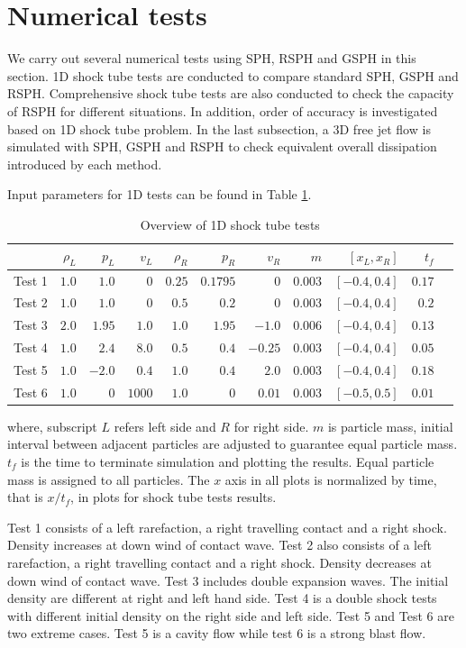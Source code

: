\section{Numerical tests}
We carry out several numerical tests using SPH, RSPH and GSPH in this section.
1D shock tube tests are conducted to compare standard SPH, GSPH and RSPH. Comprehensive shock tube tests are also conducted to check the capacity of RSPH for different situations. In addition, order of accuracy is investigated based on 1D shock tube problem. 
In the last subsection, a 3D free jet flow is simulated with SPH, GSPH and RSPH to check equivalent overall dissipation introduced by each method.

Input parameters for 1D tests can be found in Table \ref{tab:1D-shock-input_parameters}. 
\begin{table}[htp]
\centering
      \caption{Overview of 1D shock tube tests}		
	  \begin{tabular}{lrrrrrrrrrr}
	    \hline
	          & $\rho_L$ & $p_L$ &$v_L$ & $\rho_R$ & $p_R$ &$v_R$ & $m$ & $[x_L, x_R]$ & $t_f$\\
	    \hline
	    Test 1 & $1.0$ & $1.0$ &$0$ & $0.25$ & $0.1795$ &$0$ & $0.003$  & $[-0.4, 0.4]$ & $0.17$\\
	    	Test 2 & $1.0$ & $1.0$ &$0$ & $0.5$ & $0.2$ &$0$ & $0.003$  & $[-0.4, 0.4]$ & $0.2$\\
	    	Test 3 & $2.0$ & $1.95$ &$1.0$ & $1.0$ & $1.95$ &$-1.0$  & $0.006$  & $[-0.4, 0.4]$ & $0.13$\\
	    Test 4 & $1.0$ & $2.4$ &$8.0$ & $0.5$ & $0.4$ &$-0.25$ & $0.003$  & $[-0.4, 0.4]$ & $0.05$\\
	    	Test 5 & $1.0$ & $-2.0$ &$0.4$ & $1.0$ & $0.4$ &$2.0$ & $0.003$  & $[-0.4, 0.4]$ & $0.18$\\
	    	Test 6 & $1.0$ & $0$ &$1000$ & $1.0$ & $0$ &$0.01$ & $0.003$  & $[-0.5, 0.5]$  & $0.01$\\
	    \hline
	  \end{tabular}
	  \label{tab:1D-shock-input_parameters}
\end{table}
where, subscript $L$ refers left side and $R$ for right side. $m$ is particle mass, initial interval between adjacent particles are adjusted to guarantee equal particle mass. $t_f$ is the time to terminate simulation and plotting the results. Equal particle mass is assigned to all particles. The $x$ axis in all plots is normalized by time, that is $x/t_f$, in plots for shock tube tests results.

Test 1 consists of a left rarefaction, a right travelling contact and a right shock. Density increases at down wind of contact wave.
Test 2 also consists of a left rarefaction, a right travelling contact and a right shock. Density decreases at down wind of contact wave.
Test 3 includes double expansion waves. The initial density are different at right and left hand side.
Test 4 is a double shock tests with different initial density on the right side and left side.
Test 5 and Test 6 are two extreme cases. Test 5 is a cavity flow while test 6 is a strong blast flow.

